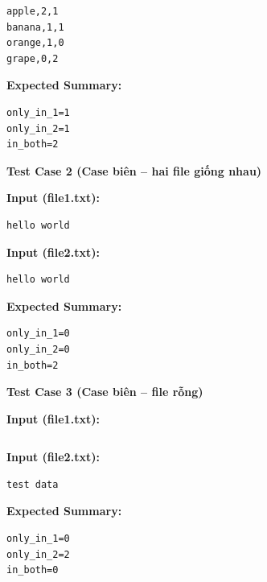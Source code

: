 \begin{lstlisting}
apple,2,1
banana,1,1
orange,1,0
grape,0,2
\end{lstlisting}

\textbf{Expected Summary:}

\begin{lstlisting}
only_in_1=1
only_in_2=1
in_both=2
\end{lstlisting}

\vspace{0.5cm}

\textbf{Test Case 2 (Case biên -- hai file giống nhau)}

\textbf{Input (file1.txt):}

\begin{lstlisting}
hello world
\end{lstlisting}

\textbf{Input (file2.txt):}

\begin{lstlisting}
hello world
\end{lstlisting}

\textbf{Expected Summary:}

\begin{lstlisting}
only_in_1=0
only_in_2=0
in_both=2
\end{lstlisting}

\vspace{0.5cm}

\textbf{Test Case 3 (Case biên -- file rỗng)}

\textbf{Input (file1.txt):}

\begin{lstlisting}

\end{lstlisting}

\textbf{Input (file2.txt):}

\begin{lstlisting}
test data
\end{lstlisting}

\textbf{Expected Summary:}

\begin{lstlisting}
only_in_1=0
only_in_2=2
in_both=0
\end{lstlisting}
